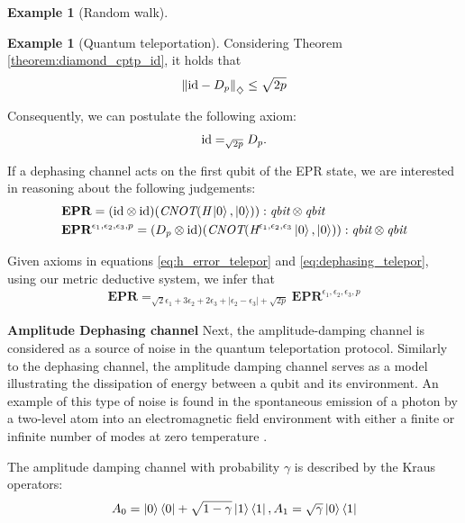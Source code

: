 \documentclass[10pt,a4paper]{amsart}
\theoremstyle{definition}
\theoremstyle{definition}
\newtheorem{example}[definition]{Example}
\theoremstyle{definition}
\theoremstyle{definition}
\theoremstyle{definition}
\theoremstyle{definition}
\begin{document}
\begin{example}[Random walk]
\begin{example}[Quantum teleportation]
     Considering Theorem \ref{theorem:diamond_cptp_id}, it holds that
     \begin{align*}
        \left\lVert  \mathrm{id} - D_p \right\rVert_{\diamondsuit} \leq \sqrt{2p}
     \end{align*}

     Consequently, we can postulate the following axiom:
      \begin{align} \label{eq:dephasing_telepor}
         \mathrm{id} =_{\sqrt{2p}}  D_p  .
      \end{align}

     If a dephasing channel acts on the first qubit of the EPR state, we are interested in reasoning about the following judgements:
     \begin{align*}
      &\textbf{EPR} = (\mathrm{id} \otimes \mathrm{id})(\emph{CNOT} (\emph{H}\ket{0},\ket{0})) : \emph{qbit} \otimes
      \emph{qbit}  \\ 
      &\textbf{EPR}^{\epsilon_1,\epsilon_2, \epsilon_3,p} =  (D_p \otimes \mathrm{id}) (\emph{CNOT} ( \emph{H}^{\epsilon_1,\epsilon_2, \epsilon_3}\ket{0},\ket{0})) : \emph{qbit} \otimes
      \emph{qbit} 
   \end{align*}

   Given axioms in equations \eqref{eq:h_error_telepor} and \eqref{eq:dephasing_telepor}, using our metric deductive system, we infer that
   \begin{align} \label{eq:epr_error_teleport}
    \textbf{EPR} =_{\sqrt{2}\epsilon_1 + 3 \epsilon_2 + 2\epsilon_3 + |\epsilon_2-\epsilon_3| + \sqrt{2p}} \textbf{EPR}^{\epsilon_1,\epsilon_2, \epsilon_3,p}
   \end{align}


     \textbf{Amplitude Dephasing channel}
     Next, the amplitude-damping channel is considered as a source of noise in the quantum teleportation protocol. Similarly to the dephasing channel, the amplitude damping channel serves as a model illustrating the dissipation of energy between a qubit and its environment. An example of this type of noise is found in the spontaneous emission of a photon by a two-level atom into an electromagnetic field environment with either a finite or infinite number of modes at zero temperature \cite{salles2008experimental, Wang_2011}.

     The amplitude damping channel with probability $\gamma$ is described by the Kraus operators:
\begin{equation*}
     A_{0}= \ket{0} \bra{0} + \sqrt{1-\gamma} \ket{1} \bra{1} ,  A_{1}= \sqrt{\gamma} \ket{0} \bra{1}
\end{equation*}


\end{example}
\end{example}
\end{document}
